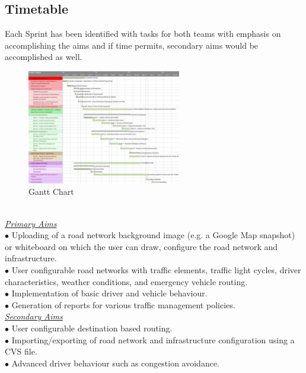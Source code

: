 \documentclass[11pt]{article}
\begin{document}
	\subsection{Timetable}\label{TT}
	Each Sprint has been identified with tasks for both teams with emphasis on accomplishing the aims and if time permits, secondary aims would be accomplished as well. 
		\begin{figure}[h]
		     	\centering
    			\includegraphics[width=0.6\textwidth]{Gantt}
    			\caption{Gantt Chart}
    			\label{fig:GC}
		\end{figure}
	\\
	\underline { \textit{Primary Aims} } \\
		$\bullet$ Uploading of a road network background image (e.g. a Google Map snapshot) or whiteboard on which the user can draw, configure the road network and infrastructure.\\
		$\bullet$ User configurable road networks with traffic elements, traffic light cycles, driver characteristics, weather conditions, and emergency vehicle routing.\\
		$\bullet$  Implementation of basic driver and vehicle behaviour.\\
	 	$\bullet$ Generation of reports for various traffic management policies.
	\\
	\underline { \textit{Secondary Aims} }
	\\
		$\bullet$ User configurable destination based routing.\\
		 $\bullet$ Importing/exporting of road network and infrastructure configuration using a CVS file.\\
		 $\bullet$ Advanced driver behaviour such as congestion avoidance.
\end{document}
